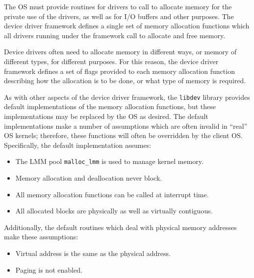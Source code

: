 
The OS must provide routines for drivers to call
to allocate memory for the private use of the drivers,
as well as for I/O buffers and other purposes.
The \oskit{} device driver framework defines a single set
of memory allocation functions
which all drivers running under the framework
call to allocate and free memory.

Device drivers often need to allocate memory
in different ways, or memory of different types,
for different purposes.
For this reason, the device driver framework defines a set of flags
provided to each memory allocation function
describing how the allocation is to be done,
or what type of memory is required.

As with other aspects of the \oskit{} device driver framework,
the {\tt libdev} library provides default implementations
of the memory allocation functions,
but these implementations may be replaced by the OS as desired.
The default implementations make a number of assumptions
which are often invalid in ``real'' OS kernels;
therefore, these functions will often be overridden by the client OS\@.
Specifically, the default implementation assumes:
\begin{itemize}
\item	The LMM pool {\tt malloc_lmm} is used to manage kernel memory.
\item	Memory allocation and deallocation never block.
\item	All memory allocation functions can be called at interrupt time.
\item	All allocated blocks are physically as well as virtually contiguous.
\end{itemize}
Additionally, the default routines which deal with physical memory
addresses make these assumptions:
\begin{itemize}
\item	Virtual address is the same as the physical address.
\item	Paging is not enabled.
\end{itemize}

